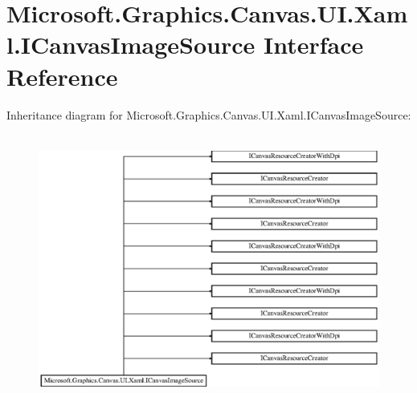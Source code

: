 \hypertarget{interface_microsoft_1_1_graphics_1_1_canvas_1_1_u_i_1_1_xaml_1_1_i_canvas_image_source}{}\section{Microsoft.\+Graphics.\+Canvas.\+U\+I.\+Xaml.\+I\+Canvas\+Image\+Source Interface Reference}
\label{interface_microsoft_1_1_graphics_1_1_canvas_1_1_u_i_1_1_xaml_1_1_i_canvas_image_source}
Inheritance diagram for Microsoft.\+Graphics.\+Canvas.\+U\+I.\+Xaml.\+I\+Canvas\+Image\+Source\+:\begin{figure}[H]
\begin{center}
\leavevmode
\includegraphics[height=8.901734cm]{interface_microsoft_1_1_graphics_1_1_canvas_1_1_u_i_1_1_xaml_1_1_i_canvas_image_source}
\end{center}
\end{figure}
